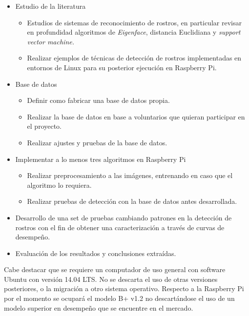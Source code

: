 \documentclass[letterpaper,12pt]{article}
\begin{document}
\begin{itemize}
\item Estudio de la literatura
\begin{itemize}
\item Estudios de sistemas de reconocimiento de rostros, en particular revisar en profundidad algoritmos de \textit{Eigenface}, distancia Euclidiana y \textit{support vector machine.}
\item Realizar ejemplos de técnicas de detección de rostros implementadas en entornos de Linux para su posterior ejecución en Raspberry Pi.
\end{itemize}
\item Base de datos
\begin{itemize}
\item Definir como fabricar una base de datos propia.
\item Realizar la base de datos en base a voluntarios que quieran participar en el proyecto.
\item Realizar ajustes y pruebas de la base de datos.
\end{itemize}
\item Implementar a lo menos tres algoritmos en Raspberry Pi
\begin{itemize}
\item Realizar preprocesamiento a las imágenes, entrenando en caso que el algoritmo lo requiera.
\item Realizar pruebas de detección con la base de datos antes desarrollada.
\end{itemize}
\item Desarrollo de una set de pruebas cambiando patrones en la detección de rostros con el fin de obtener una caracterización a través de curvas de desempeño.

\item Evaluación de los resultados y conclusiones extraídas.
\end{itemize}

Cabe destacar que se requiere un computador de uso general con software Ubuntu con versión 14.04 LTS. No se descarta el uso de otras versiones posteriores, o la migración a otro sistema operativo. Respecto a la Raspberry Pi por el momento se ocupará el modelo B+ v1.2 no descartándose el uso de un modelo superior en desempeño que se encuentre en el mercado.

\end{document}
